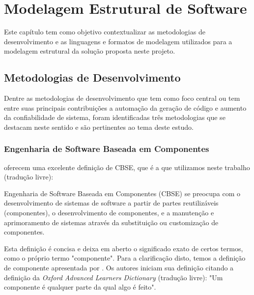 \chapter{Modelagem Estrutural de Software}
\label{chap:modelagem}

Este capítulo tem como objetivo contextualizar as metodologias de desenvolvimento e as linguagens e formatos de modelagem utilizados para a modelagem estrutural da solução proposta neste projeto.


\section{Metodologias de Desenvolvimento}
\label{chap:metod}

Dentre as metodologias de desenvolvimento que tem como foco central ou tem entre suas principais contribuições a automação da geração de código e aumento da confiabilidade de sistema, foram identificadas três metodologias que se destacam neste sentido e são pertinentes ao tema deste estudo.


\subsection{Engenharia de Software Baseada em Componentes}

 oferecem uma excelente definição de CBSE, que é a que utilizamos neste trabalho (tradução livre):

\begin{citacao}
Engenharia de Software Baseada em Componentes (CBSE) se preocupa com o desenvolvimento de sistemas de software a partir de partes reutilizáveis (componentes), o desenvolvimento de componentes, e a manutenção e aprimoramento de sistemas através da substituição ou customização de componentes.
\end{citacao}

Esta definição é concisa e deixa em aberto o significado exato de certos termos, como o próprio termo "componente". Para a clarificação disto, temos a definição de componente apresentada por . Os autores iniciam sua definição citando a definição da \textit{Oxford Advanced Learners Dictionary} (tradução livre): "Um componente é qualquer parte da qual algo é feito".

